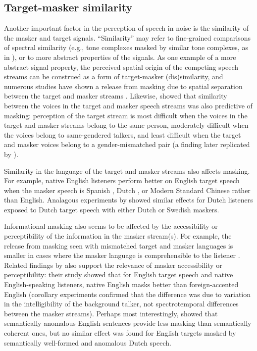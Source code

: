 \subsection{Target-masker similarity}
Another important factor in the perception of speech in noise is the similarity of the masker and target signals.  “Similarity” may refer to fine-grained comparisons of spectral similarity (e.g., tone complexes masked by similar tone complexes, as in \citealt{LeeRichards2011}), or to more abstract properties of the signals.\footnotemark{}  As one example of a more abstract signal property, the perceived spatial origin of the competing speech streams can be construed as a form of target-masker (dis)similarity, and numerous studies have shown a release from masking due to spatial separation between the target and masker streams \citep[e.g.,][]{BrungartSimpson2002, FreymanEtAl1999, FreymanEtAl2004, KiddEtAl2005a, JohnstoneLitovsky2006}.  Likewise, \citet{Brungart2001} showed that similarity between the voices in the target and masker speech streams was also predictive of masking: perception of the target stream is most difficult when the voices in the target and masker streams belong to the same person, moderately difficult when the voices belong to same-gendered talkers, and least difficult when the target and masker voices belong to a gender-mismatched pair (a finding later replicated by \citealt{HelferFreyman2008}).

Similarity in the language of the target and masker streams also affects masking.  For example, native English listeners perform better on English target speech when the masker speech is Spanish \citep{GarciaLecumberriCooke2006}, Dutch \citep{BrouwerEtAl2012}, or Modern Standard Chinese \citep{VanEngenBradlow2007} rather than English.  Analagous experiments by \citet{RhebergenEtAl2005} showed similar effects for Dutch listeners exposed to Dutch target speech with either Dutch or Swedish maskers.  

Informational masking also seems to be affected by the accessibility or perceptibility of the information in the masker stream(s).  For example, the release from masking seen with mismatched target and masker languages is smaller in cases where the masker language is comprehensible to the listener \citep{VanEngen2010}.  Related findings by \citet{CalandruccioEtAl2010} also support the relevance of masker accessibility or perceptibility: their study showed that for English target speech and native English-speaking listeners, native English masks better than foreign-accented English (corollary experiments confirmed that the difference was due to variation in the intelligibility of the background talker, not spectrotemporal differences between the masker streams).  Perhaps most interestingly, \citet{BrouwerEtAl2012} showed that semantically anomalous English sentences provide less masking than semantically coherent ones, but no similar effect was found for English targets masked by semantically well-formed and anomalous Dutch speech.

